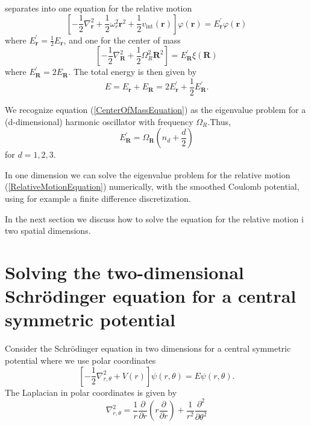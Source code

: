 \documentclass[aip,jcp,reprint,floatfix]{revtex4-1}
\begin{document}
\begin{appendices}
separates into one equation for the relative motion
\begin{equation}
    \left[- \frac{1}{2}\nabla_\mathbf{r}^2 + \frac{1}{2} \omega_r^2 \mathbf{r}^2 + \frac{1}{2}v_{\text{int}}(\mathbf{r}) \right] \varphi(\mathbf{r}) = E^\prime_\mathbf{r} \varphi(\mathbf{r}) \label{RelativeMotionEquation}
\end{equation}
where $E^\prime_\mathbf{r} = \frac{1}{2}E_\mathbf{r}$, and one for the center of mass 
\begin{equation}
    \left[- \frac{1}{2}\nabla_\mathbf{R}^2 + \frac{1}{2}\Omega_R^2 \mathbf{R}^2 \right] = E^\prime_\mathbf{R} \xi(\mathbf{R}) \label{CenterOfMassEquation}
\end{equation}
where $E^\prime_\mathbf{R} = 2 E_\mathbf{R}$. The total energy is then given by 
\begin{equation}
    E = E_\mathbf{r} + E_\mathbf{R} = 2E^\prime_\mathbf{r} + \frac{1}{2}E^\prime_\mathbf{R}.
\end{equation}

We recognize equation (\ref{CenterOfMassEquation}) as the eigenvalue problem for a (d-dimensional) harmonic oscillator with frequency $\Omega_R$.Thus, 
\begin{equation}
    E_\mathbf{R}^\prime = \Omega_\mathbf{R} \left( n_d + \frac{d}{2} \right)
\end{equation}
for $d=1,2,3$.

In one dimension we can solve the eigenvalue problem for the relative motion (\ref{RelativeMotionEquation}) numerically, with the smoothed Coulomb potential, using for example a finite difference discretization.

In the next section we discuss how to solve the equation for the relative motion i two spatial dimensions.   

\section{Solving the two-dimensional Schrödinger equation for a central symmetric potential}
Consider the Schrödinger equation in two dimensions for a central symmetric potential where we use polar coordinates 
\begin{equation}
    \left[ - \frac{1}{2} \nabla^2_{r,\theta} + V(r) \right] \psi(r,\theta) = E\psi(r,\theta). \label{SEPolar}
\end{equation}
The Laplacian in polar coordinates is given by
\begin{equation}
    \nabla_{r,\theta}^2 = \frac{1}{r} \frac{\partial}{\partial r} \left( r \frac{\partial}{\partial r} \right) + \frac{1}{r^2} \frac{\partial^2}{\partial \theta^2}
\end{equation}


\end{appendices}
\end{document}
